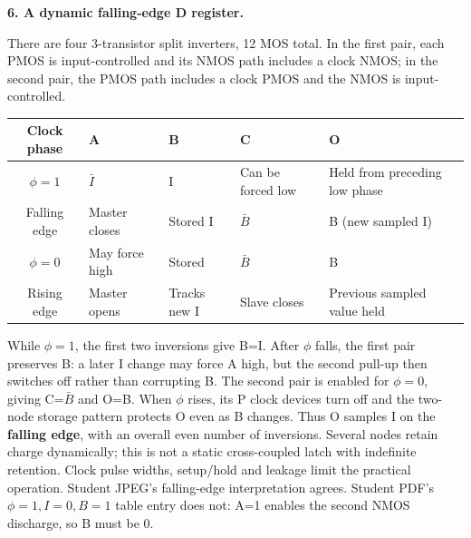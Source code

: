 \documentclass[10pt]{article}
\newcommand{\mos}[4]{\begin{scope}[shift={(#1,#2)}]
\draw (0,.24)--(0,-.24);\draw (0,.20)--(.25,.20)--(.25,.5);
\draw (0,-.20)--(.25,-.20)--(.25,-.5);\draw (-.16,.23)--(-.16,-.23);
\ifnum#4=1\draw (-.26,0) circle (.06);\draw (-.75,0)--(-.32,0);\else\draw (-.75,0)--(-.16,0);\fi
\node[anchor=east,font=\scriptsize] at (-.76,0) {$#3$};\end{scope}}
\newcommand{\ground}[2]{\draw (#1,#2)--(#1,{#2-.12});\draw ({#1-.17},{#2-.12})--({#1+.17},{#2-.12});\draw ({#1-.11},{#2-.20})--({#1+.11},{#2-.20});}
\newcommand{\rail}[3]{\draw (#1,#2)--(#1,{#2+.14});\node[above,font=\scriptsize] at (#1,{#2+.14}) {$#3$};}
\begin{document}
\newpage\textbf{6. A dynamic falling-edge D register.}
\begin{center}\end{center}
There are four 3-transistor split inverters, 12 MOS total. In the first pair, each PMOS is input-controlled and its NMOS path includes a clock NMOS; in the second pair, the PMOS path includes a clock PMOS and the NMOS is input-controlled.
\begin{center}\begin{tabular}{cllll}\toprule
Clock phase&A&B&C&O\\\midrule
$\phi=1$&$\bar I$&I&Can be forced low&Held from preceding low phase\\
Falling edge&Master closes&Stored I&$\bar B$&B (new sampled I)\\
$\phi=0$&May force high&Stored&$\bar B$&B\\
Rising edge&Master opens&Tracks new I&Slave closes&Previous sampled value held\\\bottomrule\end{tabular}\end{center}
While $\phi=1$, the first two inversions give B=I. After $\phi$ falls, the first pair preserves B: a later I change may force A high, but the second pull-up then switches off rather than corrupting B. The second pair is enabled for $\phi=0$, giving C=$\bar B$ and O=B. When $\phi$ rises, its P clock devices turn off and the two-node storage pattern protects O even as B changes. Thus O samples I on the \textbf{falling edge}, with an overall even number of inversions.
Several nodes retain charge dynamically; this is not a static cross-coupled latch with indefinite retention. Clock pulse widths, setup/hold and leakage limit the practical operation. Student JPEG's falling-edge interpretation agrees. Student PDF's $\phi=1,I=0,B=1$ table entry does not: A=1 enables the second NMOS discharge, so B must be 0.
\end{document}
